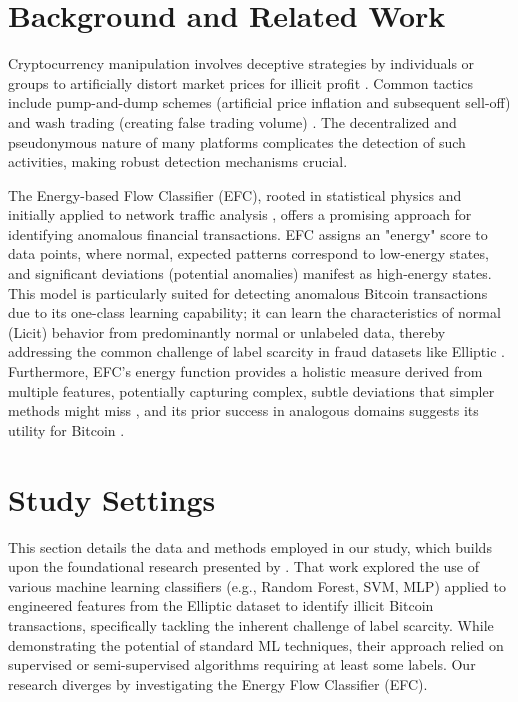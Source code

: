 \documentclass[12pt]{article}
\begin{document}
\section{Background and Related Work} \label{sec:background}
Cryptocurrency manipulation involves deceptive strategies by individuals or groups to artificially distort market prices
for illicit profit \cite{cryptocurrency_arket_manipulation_2021}. Common tactics include pump-and-dump schemes (artificial
price inflation and subsequent sell-off) and wash trading (creating false trading volume) \cite{karim2018manipulation,
gandal2018price, edelman2018detecting}. The decentralized and pseudonymous nature of many platforms complicates the detection
of such activities, making robust detection mechanisms crucial.

The Energy-based Flow Classifier (EFC), rooted in statistical physics and initially applied to network traffic analysis
\cite{pontes2019}, offers a promising approach for identifying anomalous financial transactions. EFC assigns an "energy"
score to data points, where normal, expected patterns correspond to low-energy states, and significant deviations (potential
anomalies) manifest as high-energy states. This model is particularly suited for detecting anomalous Bitcoin transactions
due to its one-class learning capability; it can learn the characteristics of normal (Licit) behavior from predominantly
normal or unlabeled data, thereby addressing the common challenge of label scarcity in fraud datasets like Elliptic
\cite{bansal2022systematic}. Furthermore, EFC's energy function provides a holistic measure derived from multiple features,
potentially capturing complex, subtle deviations that simpler methods might miss \cite{wilson2024future}, and its prior
success in analogous domains suggests its utility for Bitcoin \cite{pontes2019, souza2022novelopensetenergybased}.

\section{Study Settings} \label{sec:methods}
This section details the data and methods employed in our study, which builds upon the foundational research presented
by \cite{lorenz2021machinelearningmethodsdetect}. That work explored the use of various machine learning classifiers (e.g.,
Random Forest, SVM, MLP) applied to engineered features from the Elliptic dataset to identify illicit Bitcoin transactions,
specifically tackling the inherent challenge of label scarcity. While demonstrating the potential of standard ML techniques,
their approach relied on supervised or semi-supervised algorithms requiring at least some labels. Our research
diverges by investigating the Energy Flow Classifier (EFC). 
\end{document}
